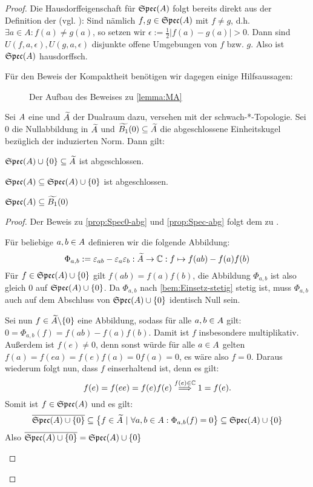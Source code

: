 \begin{proof}
Die Hausdorffeigenschaft für $\mathfrak{Spec}(A)$ folgt bereits direkt aus der Definition der \ssTop{} (vgl. \cite[Lemma 2.1.27 b)]{Baer2003}): Sind nämlich $f, g \in \mathfrak{Spec}(A)$ mit $f \neq g$, d.h. $\exists a\in A: f(a) \neq g(a)$, so setzen wir $\epsilon := \frac{1}{2} |f(a) - g(a)| > 0$. Dann sind $U(f, a, \epsilon), U(g, a, \epsilon)$ disjunkte offene Umgebungen von $f$ bzw. $g$. Also ist $\mathfrak{Spec}(A)$ hausdorffsch.

Für den Beweis der Kompaktheit benötigen wir dagegen einige Hilfsaussagen:

\begin{figure}[h]
	
	\caption{Der Aufbau des Beweises zu \cref*{lemma:MA}}
\end{figure}


\begin{prop}
Sei $A$ eine \CAlg{} und $\widetilde{A}$ der Dualraum dazu, versehen mit der schwach-*-Topologie. Sei $0$ die Nullabbildung in $\widetilde{A}$ und $\widetilde{B_1}(0) \subseteq \widetilde{A}$ die abgeschlossene Einheitskugel bezüglich der induzierten Norm. Dann gilt:
\begin{propenum}
	\item $\mathfrak{Spec}(A) \cup \{0\} \subseteq \widetilde{A}$ ist abgeschlossen. 		\label{prop:Spec0-abg} 
	\item $\mathfrak{Spec}(A) \subseteq \mathfrak{Spec}(A) \cup \{0\}$ ist abgeschlossen.		\label{prop:Spec-abg} 
	\item $\mathfrak{Spec}(A) \subseteq \widetilde{B_1}(0)$							\label{prop:Spec-in-B0} 
\end{propenum}
\end{prop}

\begin{proof}Der Beweis zu \ref*{prop:Spec0-abg} und \ref*{prop:Spec-abg} folgt dem zu \cite[Lemma 2.1.27 a), d)]{Baer2003}.
\begin{proofenum} 
	\item %
	Für beliebige $a, b \in A$ definieren wir die folgende Abbildung:
	\[\Phi_{a,b} := \varepsilon_{ab}-\varepsilon_a \varepsilon_b : \widetilde{A} \to \mathbb{C}: f \mapsto f(ab)-f(a)f(b)\]
	Für $f \in \mathfrak{Spec}(A) \cup \{0\}$ gilt $f(ab) = f(a)f(b)$, die Abbildung $\Phi_{a,b}$ ist also gleich 0 auf $\mathfrak{Spec}(A) \cup \{0\}$. Da $\Phi_{a,b}$ nach \cref{bem:Einsetz-stetig} stetig ist, muss $\Phi_{a,b}$ auch auf dem Abschluss von $\mathfrak{Spec}(A) \cup \{0\}$ identisch Null sein. 
	
Sei nun $f \in \widetilde{A} \backslash \{0\}$ eine Abbildung, sodass für alle $a, b \in A$ gilt: $0 = \Phi_{a,b}(f) = f(ab) - f(a)f(b)$. Damit ist $f$ insbesondere multiplikativ. Außerdem ist $f(e) \neq 0$, denn sonst würde für alle $a \in A$ gelten $f(a) = f(ea) = f(e)f(a) = 0f(a) = 0$, es wäre also $f = 0$. Daraus wiederum folgt nun, dass $f$ einserhaltend ist, denn es gilt:
	\[f(e) = f(ee) = f(e)f(e) \overset{f(e) \in \mathbb{C}}{\Longrightarrow} 1 = f(e).\]
Somit ist $f \in \mathfrak{Spec}(A)$ und es gilt:
	\[\overline{\mathfrak{Spec}(A) \cup \{0\}} \subseteq \big\{f \in \widetilde{A} ~|~ \forall a,b \in A: \Phi_{a,b}(f) = 0 \big\} \subseteq \mathfrak{Spec}(A) \cup \{0\} \]
	Also $\overline{\mathfrak{Spec}(A) \cup \{0\}} = \mathfrak{Spec}(A) \cup \{0\}$
	

\end{proofenum}
\end{proof}
\end{proof}
